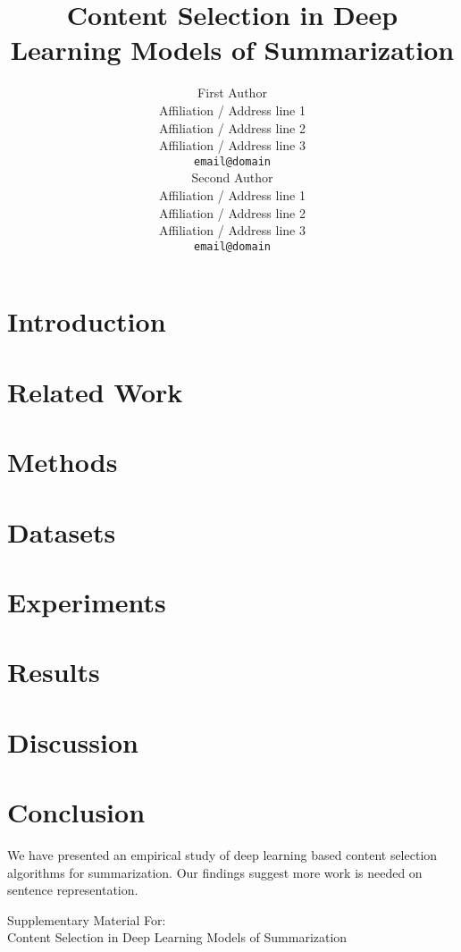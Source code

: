 \documentclass[11pt,a4paper]{article}
\title{Content Selection in Deep Learning Models of Summarization}
\author{First Author \\
  Affiliation / Address line 1 \\
  Affiliation / Address line 2 \\
  Affiliation / Address line 3 \\
  {\tt email@domain} \\\And
  Second Author \\
  Affiliation / Address line 1 \\
  Affiliation / Address line 2 \\
  Affiliation / Address line 3 \\
  {\tt email@domain} \\}
\date{}
\begin{document}
\maketitle
\begin{abstract}
\end{abstract}



\section{Introduction}


\section{Related Work}


\section{Methods}


%



\section{Datasets}
\label{sec:datasets}






\section{Experiments}


\section{Results}


\section{Discussion}



\section{Conclusion}
We have presented an empirical study of deep learning based content selection
algorithms for summarization. Our findings suggest more work is needed 
on sentence representation.






\newpage
\onecolumn
\appendix
\begin{centering}
  \Large
  Supplementary Material For:\\
  Content Selection in Deep Learning Models of Summarization\\
\end{centering}

\makeappendix
\end{document}
